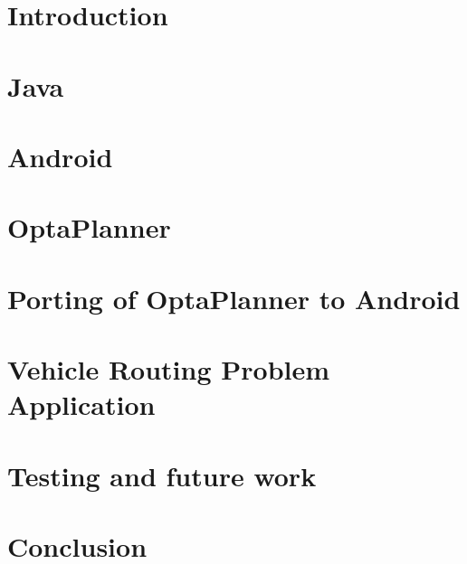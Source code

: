 \chapter{Introduction}\label{IntroductionChapter}


\chapter{Java}\label{JavaChapter}


\chapter{Android}\label{AndroidChapter}


\chapter{OptaPlanner}\label{OptaPlannerChapter}


\chapter{Porting of OptaPlanner to Android}\label{PortingChapter}


\chapter{Vehicle Routing Problem Application}\label{ApplicationChapter}


\chapter{Testing and future work}\label{TestingChapter}


\chapter{Conclusion}\label{ConclusionChapter}

